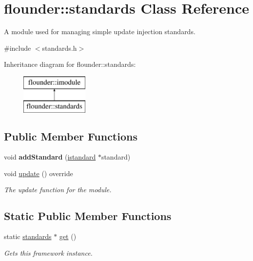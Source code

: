 \hypertarget{classflounder_1_1standards}{}\section{flounder\+:\+:standards Class Reference}
\label{classflounder_1_1standards}


A module used for managing simple update injection standards.  




{\ttfamily \#include $<$standards.\+h$>$}

Inheritance diagram for flounder\+:\+:standards\+:\begin{figure}[H]
\begin{center}
\leavevmode
\includegraphics[height=2.000000cm]{classflounder_1_1standards}
\end{center}
\end{figure}
\subsection*{Public Member Functions}
\begin{DoxyCompactItemize}
\item 
\mbox{\label{classflounder_1_1standards_a94f42d8cb4b1d27ee00952cdcd73c367}} 
void {\bfseries add\+Standard} (\hyperlink{classflounder_1_1istandard}{istandard} $\ast$standard)
\item 
void \hyperlink{classflounder_1_1standards_a681e682db67c10abb814cf0f8daf086a}{update} () override
\begin{DoxyCompactList}\small\item\em The update function for the module. \end{DoxyCompactList}\end{DoxyCompactItemize}
\subsection*{Static Public Member Functions}
\begin{DoxyCompactItemize}
\item 
static \hyperlink{classflounder_1_1standards}{standards} $\ast$ \hyperlink{classflounder_1_1standards_af31cbc5c0616e052b210cc821ebdd8d5}{get} ()
\begin{DoxyCompactList}\small\item\em Gets this framework instance. \end{DoxyCompactList}\end{DoxyCompactItemize}
